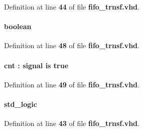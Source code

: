 Definition at line {\bf 44} of file {\bf fifo\+\_\+trnsf.\+vhd}.

\paragraph[{noprune}]{ {\bfseries \textcolor{comment}{boolean}\textcolor{vhdlchar}{ }} \hspace{0.3cm}{\ttfamily [Attribute]}}\label{classfifo__trnsf_1_1arch_a2591245f99d39267157261d7823cf9ed}


Definition at line {\bf 48} of file {\bf fifo\+\_\+trnsf.\+vhd}.

\paragraph[{noprune}]{ {\bfseries {\bfseries {\bf cnt}} \textcolor{vhdlchar}{ }\textcolor{vhdlchar}{\+:}\textcolor{vhdlchar}{ }\textcolor{keywordflow}{signal}\textcolor{vhdlchar}{ }\textcolor{keywordflow}{is}\textcolor{vhdlchar}{ }\textcolor{vhdlchar}{ }\textcolor{vhdlchar}{ }\textcolor{vhdlchar}{ }\textcolor{vhdlchar}{true}\textcolor{vhdlchar}{ }} \hspace{0.3cm}{\ttfamily [Attribute]}}\label{classfifo__trnsf_1_1arch_ab3b3a1f860b07e05afcb40c2fc2ac15d}


Definition at line {\bf 49} of file {\bf fifo\+\_\+trnsf.\+vhd}.

\paragraph[{reset\+\_\+n}]{ {\bfseries \textcolor{comment}{std\+\_\+logic}\textcolor{vhdlchar}{ }} \hspace{0.3cm}{\ttfamily [Signal]}}\label{classfifo__trnsf_1_1arch_a1f070fd63a3a7fa45c907335ea870c5b}


Definition at line {\bf 43} of file {\bf fifo\+\_\+trnsf.\+vhd}.

